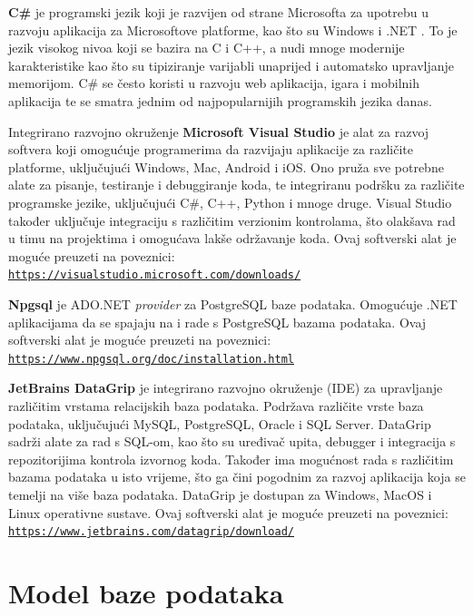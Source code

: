 \documentclass[]{foi} %
\begin{document}
\textbf{C\#} je programski jezik koji je razvijen od strane Microsofta za upotrebu u razvoju aplikacija za Microsoftove platforme, kao što su Windows i .NET \cite{microsoft}. To je jezik visokog nivoa koji se bazira na C i C++, a nudi mnoge modernije karakteristike kao što su tipiziranje varijabli unaprijed i automatsko upravljanje memorijom. C\# se često koristi u razvoju web aplikacija, igara i mobilnih aplikacija te se smatra jednim od najpopularnijih programskih jezika danas.

Integrirano razvojno okruženje \textbf{Microsoft Visual Studio} \cite{microsoft} je alat za razvoj softvera koji omogućuje programerima da razvijaju aplikacije za različite platforme, uključujući Windows, Mac, Android i iOS. Ono pruža sve potrebne alate za pisanje, testiranje i debuggiranje koda, te integriranu podršku za različite programske jezike, uključujući C\#, C++, Python i mnoge druge. Visual Studio također uključuje integraciju s različitim verzionim kontrolama, što olakšava rad u timu na projektima i omogućava lakše održavanje koda. Ovaj softverski alat je moguće preuzeti na poveznici:\\ \texttt{\href{https://visualstudio.microsoft.com/downloads/}{https://visualstudio.microsoft.com/downloads/}}

\textbf{Npgsql} \cite{npgsql} je ADO.NET \textit{provider} za PostgreSQL baze podataka. Omogućuje .NET aplikacijama da se spajaju na i rade s PostgreSQL bazama podataka. Ovaj softverski alat je moguće preuzeti na poveznici:\\ \texttt{\href{https://www.npgsql.org/doc/installation.html}{https://www.npgsql.org/doc/installation.html}}

\textbf{JetBrains DataGrip} \cite{datagrip} je integrirano razvojno okruženje (IDE) za upravljanje različitim vrstama relacijskih baza podataka. Podržava različite vrste baza podataka, uključujući MySQL, PostgreSQL, Oracle i SQL Server. DataGrip sadrži alate za rad s SQL-om, kao što su uređivač upita, debugger i integracija s repozitorijima kontrola izvornog koda. Također ima mogućnost rada s različitim bazama podataka u isto vrijeme, što ga čini pogodnim za razvoj aplikacija koja se temelji na više baza podataka. DataGrip je dostupan za Windows, MacOS i Linux operativne sustave. Ovaj softverski alat je moguće preuzeti na poveznici:\\ \texttt{\href{https://www.jetbrains.com/datagrip/download/}{https://www.jetbrains.com/datagrip/download/}}

\chapter{Model baze podataka}
\end{document}
